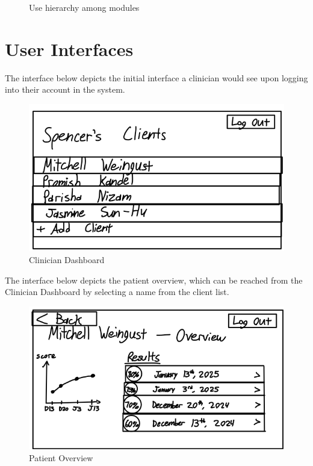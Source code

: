 \documentclass[12pt, titlepage]{article}
\begin{document}

\begin{figure}[H]
\centering
\caption{Use hierarchy among modules}
\label{FigUH}
\end{figure}


\section{User Interfaces}


\hspace{1.5em}The interface below depicts the initial interface a clinician would see upon logging into their account in the system.
\begin{figure}[H]
  \centering
  \includegraphics[scale=0.9]{images/Clinician-Dashboard.png}
  \caption{Clinician Dashboard}
\end{figure}

\hspace{1.5em}The interface below depicts the patient overview, which can be reached from the Clinician Dashboard by selecting a name from the client list.
\begin{figure}[H]
  \centering
  \includegraphics[scale=0.9]{images/Patient-Overview.png}
  \caption{Patient Overview}
\end{figure}
\end{document}
